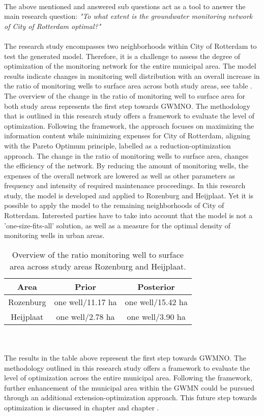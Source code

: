 \\
The above mentioned and answered sub questions act as a tool to answer the main research question: 
\newline
\textit{"To what extent is the groundwater monitoring network of City of Rotterdam optimal?"}\\
\\
The research study encompasses two neighborhoods within City of Rotterdam to test the generated model. Therefore, it is a challenge to assess the degree of optimization of the monitoring network for the entire municipal area. The model results indicate changes in monitoring well distribution with an overall increase in the ratio of monitoring wells to surface area across both study areas, see table . The overview of the change in the ratio of monitoring well to surface area for both study areas represents the first step towards GWMNO. The methodology that is outlined in this research study offers a framework to evaluate the level of optimization. Following the framework, the approach focuses on maximizing the information content while minimizing expenses for City of Rotterdam, aligning with the Pareto Optimum principle, labelled as a reduction-optimization approach. The change in the ratio of monitoring wells to surface area, changes the efficiency of the network. By reducing the amount of monitoring wells, the expenses of the overall network are lowered as well as other parameters as frequency and intensity of required maintenance proceedings. In this research study, the model is developed and applied to Rozenburg and Heijplaat. Yet it is possible to apply the model to the remaining neighborhoods of City of Rotterdam. Interested parties have to take into account that the model is not a 'one-size-fits-all' solution, as well as a measure for the optimal density of monitoring wells in urban areas.
\begin{table}[htbp]
    \centering
     \caption{Overview of the ratio monitoring well to surface area across study areas Rozenburg and Heijplaat.}
    \begin{tabular}{|c|c|c|} \hline 
         Area&  Prior& Posterior\\ \hline 
         Rozenburg&  one well/11.17 ha& one well/15.42 ha\\ \hline 
         Heijplaat&  one well/2.78 ha& one well/3.90 ha\\ \hline
    \end{tabular}

    \label{tab: concl}
\end{table}\\
\\
The results in the table above represent the first step towards GWMNO. The methodology outlined in this research study offers a framework to evaluate the level of optimization across the entire municipal area. Following the framework, further enhancement of the municipal area within the GWMN could be pursued through an additional extension-optimization approach. This future step towards optimization is discussed in chapter   and  chapter .

